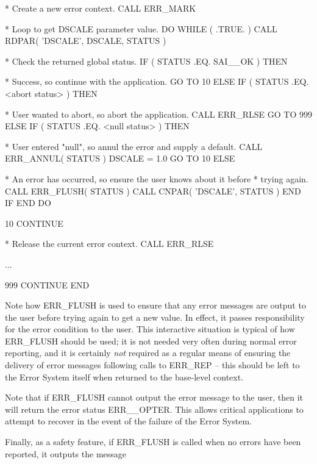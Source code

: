 \documentclass[twoside,11pt]{starlink}
\begin{document}
\begin {small}
\begin{terminalv}
*  Create a new error context.
      CALL ERR_MARK

*  Loop to get DSCALE parameter value.
      DO WHILE ( .TRUE. )
         CALL RDPAR( 'DSCALE', DSCALE, STATUS )

*     Check the returned global status.
         IF ( STATUS .EQ. SAI__OK ) THEN

*        Success, so continue with the application.
            GO TO 10
         ELSE IF ( STATUS .EQ. <abort status> ) THEN

*        User wanted to abort, so abort the application.
            CALL ERR_RLSE
            GO TO 999
         ELSE IF ( STATUS .EQ. <null status> ) THEN

*        User entered "null", so annul the error and supply a default.
            CALL ERR_ANNUL( STATUS )
            DSCALE = 1.0
            GO TO 10
         ELSE

*        An error has occurred, so ensure the user knows about it before
*        trying again.
            CALL ERR_FLUSH( STATUS )
            CALL CNPAR( 'DSCALE', STATUS )
         END IF
      END DO

 10   CONTINUE

*  Release the current error context.
      CALL ERR_RLSE

      ...

 999  CONTINUE
      END
\end{terminalv}
\end {small}

Note how ERR\_FLUSH is used to ensure that any error messages are output to
the user before trying again to get a new value.
In effect, it passes responsibility for the error condition to the user.
This interactive situation is typical of how ERR\_FLUSH should
be used; it is not needed very often during normal error reporting, and it
is certainly \emph{not} required as a regular means of ensuring the delivery
of error messages following calls to ERR\_REP --
this should be left to the Error System itself when returned to the base-level
context.

Note that if ERR\_FLUSH cannot output the error message to the user, then it
will return the error status ERR\_\_OPTER.
This allows critical applications to attempt to recover in the event of the
failure of the Error System.

Finally, as a safety feature, if ERR\_FLUSH is called when no errors have
been reported, it outputs the message
\end{document}
